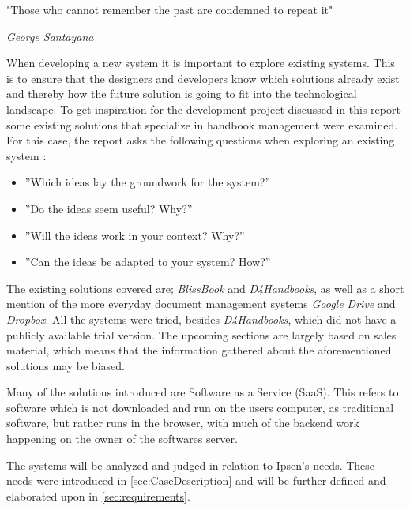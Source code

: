 \epigraph{"Those who cannot remember the past are condemned to repeat it"}{\textit{George Santayana}}
When developing a new system it is important to explore existing systems.
This is to ensure that the designers and developers know which solutions already exist and thereby how the future solution is going to fit into the technological landscape.
To get inspiration for the development project discussed in this report some existing solutions that specialize in handbook management were examined.
For this case, the report asks the following questions when exploring an existing system \citep[p.~33]{Rod-Aalborg}:

\begin{itemize}
  \item ''Which ideas lay the groundwork for the system?''
  \item ''Do the ideas seem useful? Why?''
  \item ''Will the ideas work in your context? Why?''
  \item ''Can the ideas be adapted to your system? How?''
\end{itemize}

The existing solutions covered are; \textit{BlissBook} and \textit{D4Handbooks}, as well as a short mention of the more everyday document management systems \textit{Google Drive} and \textit{Dropbox}.
All the systems were tried, besides \textit{D4Handbooks}, which did not have a publicly available trial version.
The upcoming sections are largely based on sales material, which means that the information gathered about the aforementioned solutions may be biased.

Many of the solutions introduced are Software as a Service (SaaS).
This refers to software which is not downloaded and run on the users computer, as traditional software, but rather runs in the browser, with much of the backend work happening on the owner of the softwares server. 

The systems will be analyzed and judged in relation to Ipsen's needs.
These needs were introduced in \ref{sec:CaseDescription} and will be further defined and elaborated upon in \ref{sec:requirements}.
